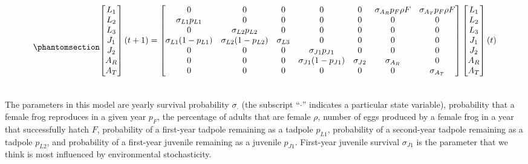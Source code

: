 \documentclass[
  letterpaper,
  DIV=11,
  numbers=noendperiod]{scrartcl}
\begin{document}
\begin{equation}\phantomsection\label{eq-matrix}{
\begin{aligned}
\begin{bmatrix}
L_1 \\
L_2 \\
L_3 \\
J_1 \\
J_2 \\
A_R \\ 
A_T
\end{bmatrix}(t + 1) = 
\begin{bmatrix}
  0 & 0 & 0 & 0 & 0 & \sigma_{A_R} p_F \rho F & \sigma_{A_T} p_F \rho F \\
  \sigma_{L1} p_{L1} & 0 & 0 & 0 & 0 & 0 & 0 \\
  0 & \sigma_{L2} p_{L2} & 0 & 0 & 0 & 0 & 0\\
  \sigma_{L1} (1 - p_{L1}) & \sigma_{L2} (1 - p_{L2}) & \sigma_{L3} & 0 & 0 & 0 & 0 \\
  0 & 0 & 0 & \sigma_{J1} p_{J1} & 0 & 0 & 0 \\
  0 & 0 & 0 & \sigma_{J1} (1 - p_{J1}) & \sigma_{J2}  & \sigma_{A_R} & 0 \\
  0 & 0 & 0 & 0 & 0 & 0 & \sigma_{A_T} 
\end{bmatrix} \begin{bmatrix}
L_1 \\
L_2 \\
L_3 \\
J_1 \\
J_2 \\
A_R \\
A_T \\
\end{bmatrix}(t) \\
\hspace{0.0001cm}
\end{aligned}
}\end{equation}

The parameters in this model are yearly survival probability
\(\sigma_{\cdot}\) (the subscript ``\(\cdot\)'' indicates a particular
state variable), probability that a female frog reproduces in a given
year \(p_F\), the percentage of adults that are female \(\rho\), number
of eggs produced by a female frog in a year that successfully hatch
\(F\), probability of a first-year tadpole remaining as a tadpole
\(p_{L1}\), probability of a second-year tadpole remaining as a tadpole
\(p_{L2}\), and probability of a first-year juvenile remaining as a
juvenile \(p_{J1}\). First-year juvenile survival \(\sigma_{J1}\) is the
parameter that we think is most influenced by environmental
stochasticity.
\end{document}
